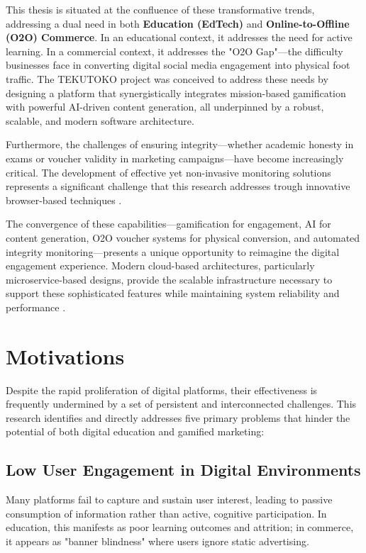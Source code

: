 This thesis is situated at the confluence of these transformative trends, addressing a dual need in both \textbf{Education (EdTech)} and \textbf{Online-to-Offline (O2O) Commerce}.
In an educational context, it addresses the need for active learning. In a commercial context, it addresses the "O2O Gap"—the difficulty businesses face in converting digital social media engagement into physical foot traffic. The TEKUTOKO project was conceived to address these needs by designing a platform that synergistically integrates mission-based gamification with powerful AI-driven content generation, all underpinned by a robust, scalable, and modern software architecture.

Furthermore, the challenges of ensuring integrity—whether academic honesty in exams or voucher validity in marketing campaigns—have become increasingly critical. The development of effective yet non-invasive monitoring solutions represents a significant challenge that this research addresses trough innovative browser-based techniques \citep{balderas2021}.

The convergence of these capabilities—gamification for engagement, AI for content generation, O2O voucher systems for physical conversion, and automated integrity monitoring—presents a unique opportunity to reimagine the digital engagement experience. Modern cloud-based architectures, particularly microservice-based designs, provide the scalable infrastructure necessary to support these sophisticated features while maintaining system reliability and performance \citep{richards2020}.

\section{Motivations}
\label{sec:intro_motivations}

Despite the rapid proliferation of digital platforms, their effectiveness is frequently undermined by a set of persistent and interconnected challenges. This research identifies and directly addresses five primary problems that hinder the potential of both digital education and gamified marketing:

\subsection{Low User Engagement in Digital Environments}
Many platforms fail to capture and sustain user interest, leading to passive consumption of information rather than active, cognitive participation. In education, this manifests as poor learning outcomes and attrition; in commerce, it appears as "banner blindness" where users ignore static advertising.

